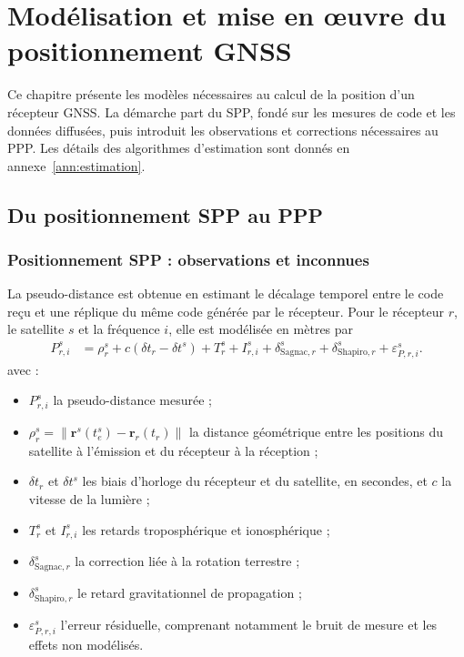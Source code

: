 \chapter{Modélisation et mise en œuvre du positionnement GNSS}
\label{chap:modelisation}

Ce chapitre présente les modèles nécessaires au calcul de la position d'un
récepteur GNSS. La démarche part du SPP, fondé sur les mesures de code et les
données diffusées, puis introduit les observations et corrections nécessaires
au PPP. Les détails des algorithmes d'estimation sont donnés en
annexe~\ref{ann:estimation}.

\section{Du positionnement SPP au PPP}
\label{sec:theorie_positionnement}

\subsection{Positionnement SPP : observations et inconnues}

La pseudo-distance est obtenue en estimant le décalage temporel entre le code
reçu et une réplique du même code générée par le récepteur. Pour le récepteur
$r$, le satellite $s$ et la fréquence $i$, elle est modélisée en mètres par
\begin{align}
P_{r,i}^s &=
\rho_r^s+c(\delta t_r-\delta t^s)+T_r^s+I_{r,i}^s
+\delta_{\mathrm{Sagnac},r}^s+\delta_{\mathrm{Shapiro},r}^s
+\varepsilon_{P,r,i}^s.
\label{new:code}
\end{align}
avec :
\begin{itemize}
\item $P_{r,i}^s$ la pseudo-distance mesurée ;
\item $\rho_r^s=\|\mathbf r^s(t_e^s)-\mathbf r_r(t_r)\|$ la distance
géométrique entre les positions du satellite à l'émission et du récepteur
à la réception ;
\item $\delta t_r$ et $\delta t^s$ les biais d'horloge du récepteur et du
satellite, en secondes, et $c$ la vitesse de la lumière ;
\item $T_r^s$ et $I_{r,i}^s$ les retards troposphérique et ionosphérique ;
\item $\delta_{\mathrm{Sagnac},r}^s$ la correction liée à la rotation terrestre ;
\item $\delta_{\mathrm{Shapiro},r}^s$ le retard gravitationnel de propagation ;
\item $\varepsilon_{P,r,i}^s$ l'erreur résiduelle, comprenant notamment le bruit
de mesure et les effets non modélisés.
\end{itemize}

